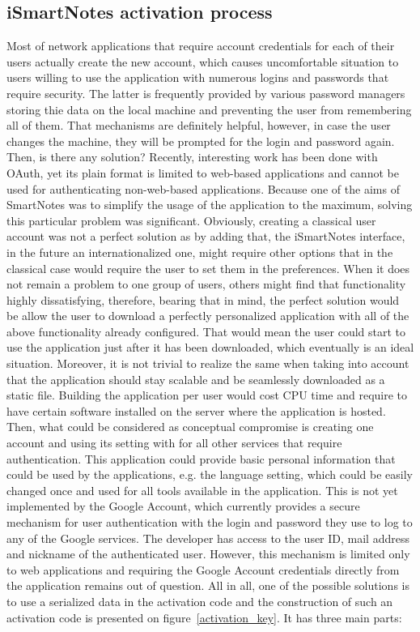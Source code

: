 \subsection{iSmartNotes activation process}\label{subsec:ismartnotes_activation}
Most of network applications that require account credentials for each of their users actually create the new account, which causes uncomfortable situation to users willing to use the application with numerous logins and passwords that require security. The latter is frequently provided by various password managers storing thie data on the local machine and preventing the user from remembering all of them. That mechanisms are definitely helpful, however, in case the user changes the machine, they will be prompted for the login and password again. Then, is there any solution? Recently, interesting work has been done with OAuth, yet its plain format is limited to web-based applications and cannot be used for authenticating non-web-based applications. Because one of the aims of SmartNotes was to simplify the usage of the application to the maximum, solving this particular problem was significant. Obviously, creating a classical user account was not a perfect solution as by adding that, the iSmartNotes interface, in the future an internationalized one, might require other options that in the classical case would require the user to set them in the preferences. When it does not remain a problem to one group of users, others might find that functionality highly dissatisfying, therefore, bearing that in mind, the perfect solution would be allow the user to download a perfectly personalized application with all of the above functionality already configured. That would mean the user could start to use the application just after it has been downloaded, which eventually is an ideal situation. Moreover, it is not trivial to realize the same when taking into account that the application should stay scalable and be seamlessly downloaded as a static file. Building the application per user would cost CPU time and require to have certain software installed on the server where the application is hosted. Then, what could be considered as conceptual compromise is creating one account and using its setting with for all other services that require authentication. This application could provide basic personal information that could be used by the applications, e.g. the language setting, which could be easily changed once and used for all tools available in the application. This is not yet implemented by the Google Account, which currently provides a secure mechanism for user authentication with the login and password they use to log to any of the Google services. The developer has access to the user ID, mail address and nickname of the authenticated user. However, this mechanism is limited only to web applications and requiring the Google Account credentials directly from the application remains out of question. All in all, one of the possible solutions is to use a serialized data in the activation code and the construction of such an activation code is presented on figure~\ref{activation_key}. It has three main parts:
